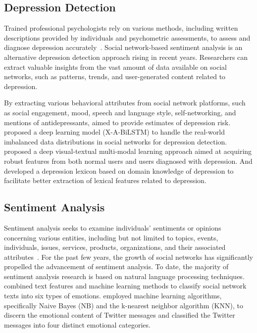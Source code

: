 \documentclass[runningheads]{llncs}
\begin{document}
\subsection{Depression Detection}
Trained professional psychologists rely on various methods, including written descriptions provided by individuals and psychometric assessments, to assess and diagnose depression accurately~\cite{orabi2018deep}. Social network-based sentiment analysis is an alternative depression detection approach rising in recent years. Researchers can extract valuable insights from the vast amount of data available on social networks, such as patterns, trends, and user-generated content related to depression. 

By extracting various behavioral attributes from social network platforms, such as social engagement, mood, speech and language style, self-networking, and mentions of antidepressants, \cite{de2013predicting} aimed to provide estimates of depression risk. \cite{cong2018xa} proposed a deep learning model (X-A-BiLSTM) to handle the real-world imbalanced data distributions in social networks for depression detection. \cite{lin2020sensemood} proposed a deep visual-textual multi-modal learning approach aimed at acquiring robust features from both normal users and users diagnosed with depression. And \cite{guo2023leveraging} developed a depression lexicon based on domain knowledge of depression to facilitate better extraction of lexical features related to depression. 

\subsection{Sentiment Analysis}
Sentiment analysis seeks to examine individuals' sentiments or opinions concerning various entities, including but not limited to topics, events, individuals, issues, services, products, organizations, and their associated attributes~\cite{yue2019survey}. For the past few years, the growth of social networks has significantly propelled the advancement of sentiment analysis. To date, the majority of sentiment analysis research is based on natural language processing techniques. \cite{gaind2019emotion} combined text features and machine learning methods to classify social network texts into six types of emotions. \cite{suhasini2020emotion} employed machine learning algorithms, specifically Naive Bayes (NB) and the k-nearest neighbor algorithm (KNN), to discern the emotional content of Twitter messages and classified the Twitter messages into four distinct emotional categories.
\end{document}
